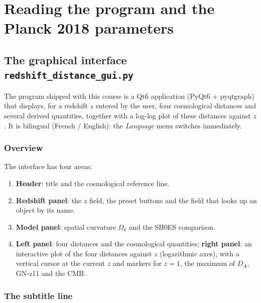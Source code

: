 \documentclass[11pt,a4paper,openany]{report}
\newcommand{\Ok}{\Omega_{k}}
\begin{document}
\part{Reading the program and the Planck 2018 parameters}

\chapter[The graphical interface]{The graphical interface\\ \texttt{redshift\_distance\_gui.py}}
\label{chap:gui}

The program shipped with this course is a Qt6 application (PyQt6 + pyqtgraph)
that displays, for a redshift $z$ entered by the user, four cosmological
distances and several derived quantities, together with a log-log plot of these
distances against $z$. It is bilingual (French / English): the
\emph{Language} menu switches immediately.

\section{Overview}

The interface has four areas:

\begin{enumerate}[topsep=2pt]
\item \textbf{Header}: title and the cosmological reference line.
\item \textbf{Redshift panel}: the $z$ field, the preset buttons and the
field that looks up an object by its name.
\item \textbf{Model panel}: spatial curvature $\Ok$ and the SH0ES comparison.
\item \textbf{Left panel}: four distances and the cosmological quantities;
\textbf{right panel}: an interactive plot of the four distances against $z$
(logarithmic axes), with a vertical cursor at the current $z$ and markers for
$z=1$, the maximum of $D_A$, GN-z11 and the CMB.
\end{enumerate}

\section{The subtitle line}
\label{sec:subtitle}
\end{document}

